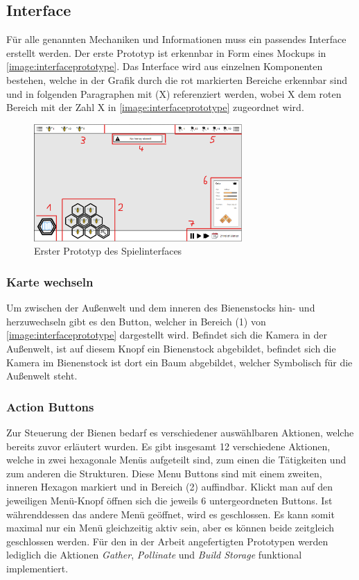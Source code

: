 \subsection{Interface}
Für alle genannten Mechaniken und Informationen muss ein passendes Interface erstellt werden. Der erste Prototyp ist erkennbar in Form eines Mockups in  \autoref{image:interfaceprototype}. Das Interface wird aus einzelnen Komponenten bestehen, welche in der Grafik durch die rot markierten Bereiche erkennbar sind und in folgenden Paragraphen mit (X) referenziert werden, wobei X dem roten Bereich mit der Zahl X in \autoref{image:interfaceprototype} zugeordnet wird.

\begin{figure}
    \begin{center}
        \includegraphics[width=300px]{0.bilder/interfaceprototype.png}
    \end{center}
    \caption{Erster Prototyp des Spielinterfaces} \label{image:interfaceprototype}
\end{figure}

\subsubsection{Karte wechseln}
Um zwischen der Außenwelt und dem inneren des Bienenstocks hin- und herzuwechseln gibt es den Button, welcher in Bereich (1) von \autoref{image:interfaceprototype} dargestellt wird. Befindet sich die Kamera in der Außenwelt, ist auf diesem Knopf ein Bienenstock abgebildet, befindet sich die Kamera im Bienenstock ist dort ein Baum abgebildet, welcher Symbolisch für die Außenwelt steht.

\subsubsection{Action Buttons}
Zur Steuerung der Bienen bedarf es verschiedener auswählbaren Aktionen, welche bereits zuvor erläutert wurden. Es gibt insgesamt 12 verschiedene Aktionen, welche in zwei hexagonale Menüs aufgeteilt sind, zum einen die Tätigkeiten und zum anderen die Strukturen. Diese Menu Buttons sind mit einem zweiten, inneren Hexagon markiert und in Bereich (2) auffindbar. Klickt man auf den jeweiligen Menü-Knopf öffnen sich die jeweils 6 untergeordneten Buttons. Ist währenddessen das andere Menü geöffnet, wird es geschlossen. Es kann somit maximal nur ein Menü gleichzeitig aktiv sein, aber es können beide zeitgleich geschlossen werden. Für den in der Arbeit angefertigten Prototypen werden lediglich die Aktionen \textit{Gather}, \textit{Pollinate} und \textit{Build Storage} funktional implementiert.

